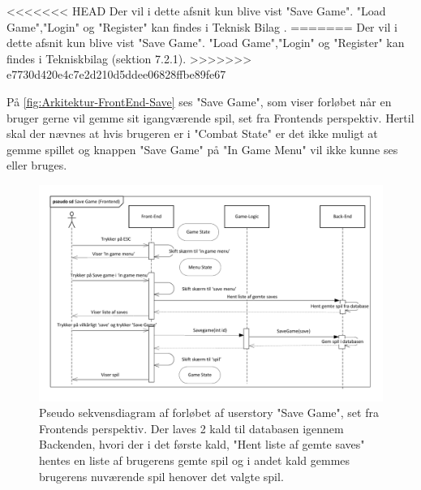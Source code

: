 <<<<<<< HEAD
Der vil i dette afsnit kun blive vist "Save Game". "Load Game","Login" og "Register" kan findes i Teknisk Bilag \parencite[][Section 9.2.1]{TekniskBilag}.
=======
Der vil i dette afsnit kun blive vist "Save Game". "Load Game","Login" og "Register" kan findes i Tekniskbilag (sektion 7.2.1).
>>>>>>> e7730d420e4c7e2d210d5ddee06828ffbe89fe67

\noindent På \autoref{fig:Arkitektur-FrontEnd-Save} ses "Save Game", som viser forløbet når en bruger gerne vil gemme sit igangværende spil, set fra Frontends perspektiv. 
Hertil skal der nævnes at hvis brugeren er i "Combat State" er det ikke muligt at gemme spillet og knappen "Save Game" på "In Game Menu" vil ikke kunne ses eller bruges.\\

\begin{figure}[H]
\centering
\includegraphics[width = \textwidth]{02-Body/Images/Front-End_-_Arkitektur-savegame.pdf}
\caption{Pseudo sekvensdiagram af forløbet af userstory "Save Game", set fra Frontends perspektiv. Der laves 2 kald til databasen igennem Backenden, hvori der i det første kald,  "Hent liste af gemte saves" hentes en liste af brugerens gemte spil og i andet kald gemmes brugerens nuværende spil henover det valgte spil.}
\label{fig:Arkitektur-FrontEnd-Save}
\end{figure}

\newpage
